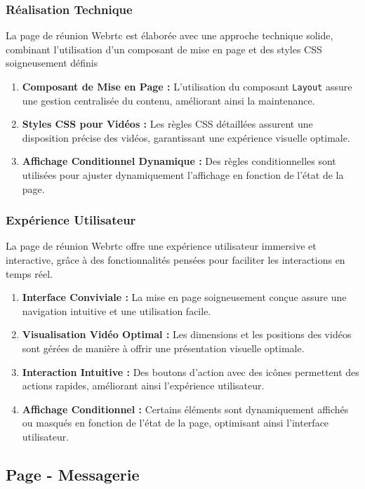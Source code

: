 \documentclass[12pt, a4paper, oneside]{article}
\begin{document}
\subsubsection{Réalisation Technique}
La page de réunion Webrtc est élaborée avec une approche technique solide, combinant l'utilisation d'un composant de mise en page et des styles CSS soigneusement définis

\begin{enumerate}
    \item \textbf{Composant de Mise en Page :} L'utilisation du composant \texttt{Layout} assure une gestion centralisée du contenu, améliorant ainsi la maintenance.
    \item \textbf{Styles CSS pour Vidéos :} Les règles CSS détaillées assurent une disposition précise des vidéos, garantissant une expérience visuelle optimale.
    \item \textbf{Affichage Conditionnel Dynamique :} Des règles conditionnelles sont utilisées pour ajuster dynamiquement l'affichage en fonction de l'état de la page.
\end{enumerate}

\subsubsection{Expérience Utilisateur}
La page de réunion Webrtc offre une expérience utilisateur immersive et interactive, grâce à des fonctionnalités pensées pour faciliter les interactions en temps réel.

\begin{enumerate}
    \item \textbf{Interface Conviviale :} La mise en page soigneusement conçue assure une navigation intuitive et une utilisation facile.
    \item \textbf{Visualisation Vidéo Optimal :} Les dimensions et les positions des vidéos sont gérées de manière à offrir une présentation visuelle optimale.
    \item \textbf{Interaction Intuitive :} Des boutons d'action avec des icônes permettent des actions rapides, améliorant ainsi l'expérience utilisateur.
    \item \textbf{Affichage Conditionnel :} Certains éléments sont dynamiquement affichés ou masqués en fonction de l'état de la page, optimisant ainsi l'interface utilisateur.
\end{enumerate}


\newpage
\subsection{Page - Messagerie}
\end{document}
